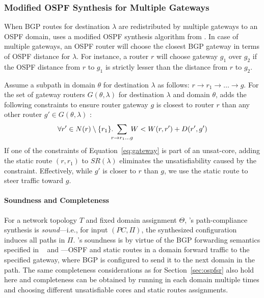 \subsubsection{Modified OSPF Synthesis for Multiple Gateways}
When BGP routes for destination $\lambda$ 
are redistributed by multiple gateways to an 
OSPF domain, \name uses a modified OSPF synthesis
algorithm from .
In case of multiple gateways, an OSPF router will choose
the closest BGP gateway in terms of OSPF distance 
for $\lambda$. For instance, a router $r$ will choose
gateway $g_1$ over $g_2$ if the OSPF distance from $r$ to $g_1$ 
is strictly lesser than the distance from $r$ to $g_2$. 

Assume a subpath in domain $\theta$ for destination $\lambda$
as follows: $r \rightarrow r_1 \rightarrow \ldots \rightarrow g$. 
For the set of gateway
routers $G(\theta, \lambda)$ 
for destination $\lambda$ and domain $\theta$,
\name adds the following constraints to ensure
router gateway $g$ is closest to router $r$ than
any other router $g' \in G(\theta, \lambda)$ :
\begin{equation} \label{eq:gateway}
\forall r' \in N(r) \setminus \{r_1\}.~
\sum_{\mathclap{r \rightarrow r_1 \ldots g }}~W < 
W(r, r') + D(r', g')
\end{equation}
If one of the constraints of Equation~\ref{eq:gateway}
is part of an unsat-core, 
adding the static route $(r, r_1)$ 
to $SR(\lambda)$ eliminates the unsatisfiability caused by  
the constraint. Effectively, while $g'$ is closer to
$r$ than $g$, we use the static route to steer traffic toward $g$. 

\paragraph{Soundness and Completeness}
For a network topology $T$ and 
fixed domain assignment $\Theta$, \name's path-compliance
synthesis is \emph{sound}---i.e., for input $(PC, \Pi)$, the 
synthesized configuration 
 induces all paths in $\Pi$. 
\name's soundness is by virtue of the BGP forwarding semantics specified in ~
and ---OSPF and static routes in a domain 
forward traffic to the specified gateway, where BGP is configured to 
send it to the next domain in the path. 
The same completeness considerations as for Section~\ref{sec:ospfsr} also hold here
and completeness can be obtained by running  in each domain multiple times and choosing different
unsatisfiable cores and static routes assignments.